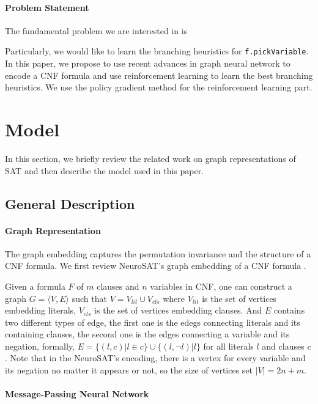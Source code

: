 \documentclass[sigplan,10pt]{acmart}\settopmatter{printfolios=true,printccs=false,printacmref=false}
\begin{document}
\paragraph{Problem Statement}

The fundamental problem we are interested in is

Particularly, we would like to learn the branching heuristics for \texttt{f.pickVariable}.
In this paper, we propose to use recent advances in graph neural network to 
encode a CNF formula and use reinforcement learning to learn the best branching heuristics.
We use the policy gradient method for the reinforcement learning part.

\section{Model}

In this section, we briefly review the related work on graph representations of SAT
and then describe the model used in this paper.

\subsection{General Description}

\paragraph{Graph Representation}

The graph embedding captures the permutation invariance and the structure of a CNF formula.
We first review NeuroSAT's graph embedding of a CNF formula \cite{selsam2018learning}.

Given a formula $F$ of $m$ clauses and $n$ variables in CNF, 
one can construct a graph $G = \langle V, E \rangle$ such that 
$V = V_{lit} \cup V_{cls}$ where $V_{lit}$ is the set of vertices embedding literals,
$V_{cls}$ is the set of vertices embedding clauses. 
And $E$ contains two different types of edge, the first one is the edegs connecting literals and its
containing clauses, the second one is the edges connecting a variable and its negation, formally,
$ E = \{ (l, c) | l \in c \} \cup \{ (l, \neg l) | l \}$ for all literals $l$ and clauses $c$.
Note that in the NeuroSAT's encoding, there is a vertex for every variable and its negation no matter
it appears or not, so the size of vertices set $|V| = 2n + m$.

\paragraph{Message-Passing Neural Network}
\end{document}
